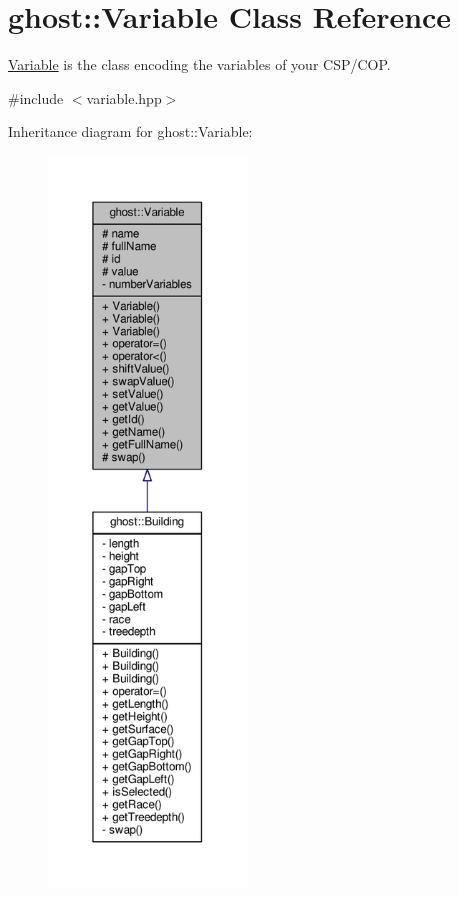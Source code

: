 \hypertarget{classghost_1_1Variable}{\section{ghost\-:\-:Variable Class Reference}
\label{classghost_1_1Variable}
}


\hyperlink{classghost_1_1Variable}{Variable} is the class encoding the variables of your C\-S\-P/\-C\-O\-P.  




{\ttfamily \#include $<$variable.\-hpp$>$}



Inheritance diagram for ghost\-:\-:Variable\-:\nopagebreak
\begin{figure}[H]
\begin{center}
\leavevmode
\includegraphics[height=550pt]{classghost_1_1Variable__inherit__graph}
\end{center}
\end{figure}


